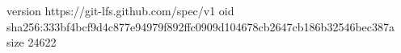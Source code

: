 version https://git-lfs.github.com/spec/v1
oid sha256:333bf4bcf9d4c877e94979f892ffc0909d104678cb2647cb186b32546bec387a
size 24622
